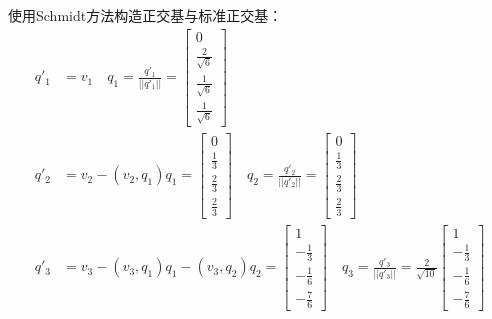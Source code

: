 \documentclass{article}
\begin{document}
\section{}
使用Schmidt方法构造正交基与标准正交基：
\begin{equation}
	\begin{aligned}
		q'_1 &= v_1\quad q_1=\frac{q'_1}{||q'_1||}=\begin{bmatrix}0\\\frac{2}{\sqrt{6}}\\\frac{1}{\sqrt{6}}\\\frac{1}{\sqrt{6}}\end{bmatrix}\\
		q'_2 &=v_2-(v_2,q_1)q_1=\begin{bmatrix}0\\\frac{1}{3}\\\frac{2}{3}\\\frac{2}{3}\end{bmatrix}\quad q_2 =\frac{q'_2}{||q'_2||}=\begin{bmatrix}0\\\frac{1}{3}\\\frac{2}{3}\\\frac{2}{3}\end{bmatrix}\\
		q'_3 &=v_3-(v_3,q_1)q_1-(v_3,q_2)q_2=\begin{bmatrix}1\\-\frac{1}{3}\\-\frac{1}{6}\\-\frac{7}{6}\end{bmatrix}\quad q_3 =\frac{q'_3}{||q'_3||}=\frac{2}{\sqrt{10}}\begin{bmatrix}1\\-\frac{1}{3}\\-\frac{1}{6}\\-\frac{7}{6}\end{bmatrix}\\		
	\end{aligned}
\end{equation}
\end{document}
